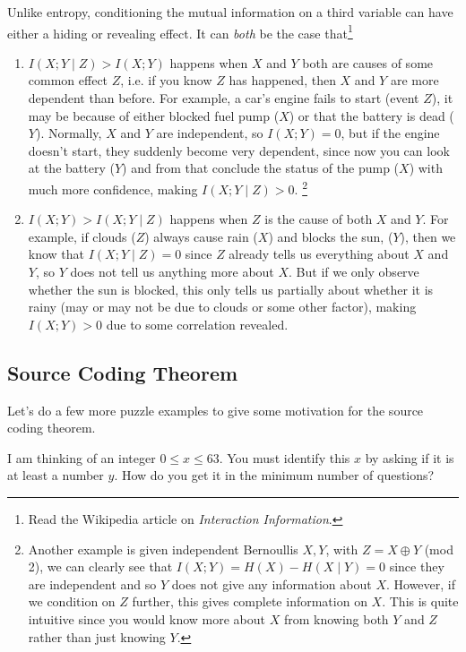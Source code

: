 \documentclass{article}
\begin{document}
    Unlike entropy, conditioning the mutual information on a third variable can have either a hiding or revealing effect. It can \textit{both} be the case that\footnote{Read the Wikipedia article on \textit{Interaction Information}.}
    \begin{enumerate}
      \item $I(X; Y \mid Z) > I(X; Y)$ happens when $X$ and $Y$ both are causes of some common effect $Z$, i.e. if you know $Z$ has happened, then $X$ and $Y$ are more dependent than before. For example, a car's engine fails to start (event $Z$), it may be because of either blocked fuel pump ($X$) or that the battery is dead ($Y$). Normally, $X$ and $Y$ are independent, so $I(X; Y) = 0$, but if the engine doesn't start, they suddenly become very dependent, since now you can look at the battery ($Y$) and from that conclude the status of the pump ($X$) with much more confidence, making $I(X; Y \mid Z) > 0$. \footnote{Another example is given independent Bernoullis $X, Y$, with $Z = X \oplus Y$ (mod 2), we can clearly see that $I(X; Y) = H(X) - H(X \mid Y) = 0$ since they are independent and so $Y$ does not give any information about $X$. However, if we condition on $Z$ further, this gives complete information on $X$. This is quite intuitive since you would know more about $X$ from knowing both $Y$ and $Z$ rather than just knowing $Y$.}

      \item $I(X; Y) > I(X; Y \mid Z)$ happens when $Z$ is the cause of both $X$ and $Y$. For example, if clouds ($Z$) always cause rain ($X$) and blocks the sun, ($Y$), then we know that $I(X; Y \mid Z) = 0$ since $Z$ already tells us everything about $X$ and $Y$, so $Y$ does not tell us anything more about $X$. But if we only observe whether the sun is blocked, this only tells us partially about whether it is rainy (may or may not be due to clouds or some other factor), making $I(X; Y) > 0$ due to some correlation revealed.   
    \end{enumerate}

  \subsection{Source Coding Theorem}

    Let's do a few more puzzle examples to give some motivation for the source coding theorem. 

    \begin{exercise}[63 Puzzle]
      I am thinking of an integer $0 \leq x \leq 63$. You must identify this $x$ by asking if it is at least a number $y$. How do you get it in the minimum number of questions? 
    \end{exercise}
\end{document}
